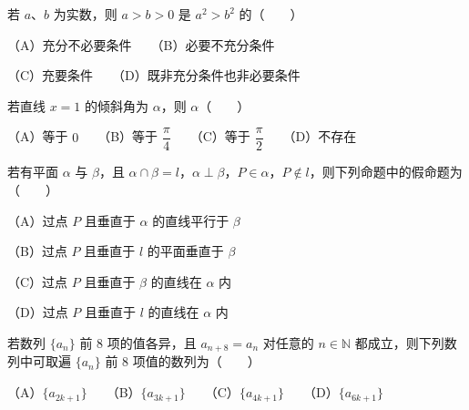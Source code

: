 \begin{question}
若 $a\text{、}b$ 为实数，则 $a>b>0$ 是 $a^2>b^2$ 的\mbox{（　　）}

（A）充分不必要条件　　（B）必要不充分条件

（C）充要条件　　（D）既非充分条件也非必要条件

\end{question}
\begin{question}
若直线 $x=1$ 的倾斜角为 $\alpha$，则 $\alpha$\mbox{（　　）}

（A）等于 $0$　　（B）等于 $\dfrac\pi4$　　（C）等于 $\dfrac\pi2$　　（D）不存在

\end{question}
\begin{question}
若有平面 $\alpha$ 与 $\beta$，且 $\alpha\cap\beta=l$，$\alpha\perp\beta$，$P\in\alpha$，$P\notin l$，则下列命题中的假命题为\mbox{（　　）}

（A）过点 $P$ 且垂直于 $\alpha$ 的直线平行于 $\beta$

（B）过点 $P$ 且垂直于 $l$ 的平面垂直于 $\beta$

（C）过点 $P$ 且垂直于 $\beta$ 的直线在 $\alpha$ 内

（D）过点 $P$ 且垂直于 $l$ 的直线在 $\alpha$ 内

\end{question}
\begin{question}
若数列 $\{a_n\}$ 前 $8$ 项的值各异，且 $a_{n+8}=a_n$ 对任意的 $n\in\mathbb N$ 都成立，则下列数列中可取遍 $\{a_n\}$ 前 $8$ 项值的数列为\mbox{（　　）}

（A）$\{a_{2k+1}\}$　　（B）$\{a_{3k+1}\}$　　（C）$\{a_{4k+1}\}$　　（D）$\{a_{6k+1}\}$

\end{question}

